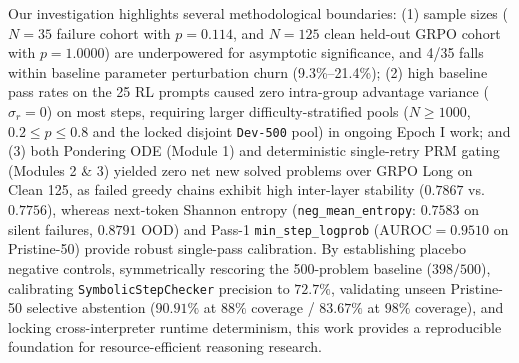 \documentclass[11pt,a4paper]{article}
\begin{document}
Our investigation highlights several methodological boundaries: (1) sample sizes ($N=35$ failure cohort with $p=0.114$, and $N=125$ clean held-out GRPO cohort with $p=1.0000$) are underpowered for asymptotic significance, and 4/35 falls within baseline parameter perturbation churn (9.3\%--21.4\%); (2) high baseline pass rates on the 25 RL prompts caused zero intra-group advantage variance ($\sigma_r=0$) on most steps, requiring larger difficulty-stratified pools ($N \ge 1000$, $0.2 \le p \le 0.8$ and the locked disjoint \texttt{Dev-500} pool) in ongoing Epoch I work; and (3) both Pondering ODE (Module 1) and deterministic single-retry PRM gating (Modules 2 \& 3) yielded zero net new solved problems over GRPO Long on Clean 125, as failed greedy chains exhibit high inter-layer stability ($0.7867$ vs.\ $0.7756$), whereas next-token Shannon entropy (\texttt{neg\_mean\_entropy}: $0.7583$ on silent failures, $0.8791$ OOD) and Pass-1 \texttt{min\_step\_logprob} ($\text{AUROC}=0.9510$ on Pristine-50) provide robust single-pass calibration. By establishing placebo negative controls, symmetrically rescoring the 500-problem baseline ($398/500$), calibrating \texttt{SymbolicStepChecker} precision to $72.7\%$, validating unseen Pristine-50 selective abstention ($90.91\%$ at $88\%$ coverage / $83.67\%$ at $98\%$ coverage), and locking cross-interpreter runtime determinism, this work provides a reproducible foundation for resource-efficient reasoning research.
\end{document}
